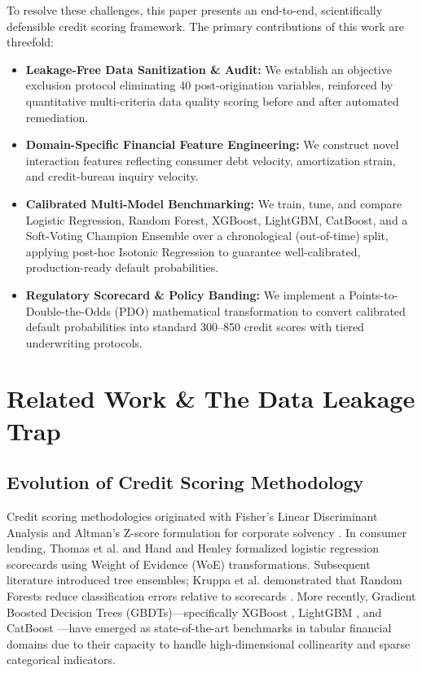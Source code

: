 \documentclass[conference]{IEEEtran}
\begin{document}
To resolve these challenges, this paper presents an end-to-end, scientifically defensible credit scoring framework. The primary contributions of this work are threefold:
\begin{itemize}
    \item \textbf{Leakage-Free Data Sanitization \& Audit:} We establish an objective exclusion protocol eliminating 40 post-origination variables, reinforced by quantitative multi-criteria data quality scoring before and after automated remediation.
    \item \textbf{Domain-Specific Financial Feature Engineering:} We construct novel interaction features reflecting consumer debt velocity, amortization strain, and credit-bureau inquiry velocity.
    \item \textbf{Calibrated Multi-Model Benchmarking:} We train, tune, and compare Logistic Regression, Random Forest, XGBoost, LightGBM, CatBoost, and a Soft-Voting Champion Ensemble over a chronological (out-of-time) split, applying post-hoc Isotonic Regression to guarantee well-calibrated, production-ready default probabilities.
    \item \textbf{Regulatory Scorecard \& Policy Banding:} We implement a Points-to-Double-the-Odds (PDO) mathematical transformation to convert calibrated default probabilities into standard 300--850 credit scores with tiered underwriting protocols.
\end{itemize}

\section{Related Work \& The Data Leakage Trap}

\subsection{Evolution of Credit Scoring Methodology}
Credit scoring methodologies originated with Fisher's Linear Discriminant Analysis and Altman's Z-score formulation for corporate solvency \cite{altman1968}. In consumer lending, Thomas et al. \cite{thomas2002} and Hand and Henley \cite{hand1997} formalized logistic regression scorecards using Weight of Evidence (WoE) transformations. Subsequent literature introduced tree ensembles; Kruppa et al. demonstrated that Random Forests reduce classification errors relative to scorecards \cite{kruppa2013}. More recently, Gradient Boosted Decision Trees (GBDTs)---specifically XGBoost \cite{chen2016}, LightGBM \cite{ke2017}, and CatBoost \cite{prokhorenkova2018}---have emerged as state-of-the-art benchmarks in tabular financial domains due to their capacity to handle high-dimensional collinearity and sparse categorical indicators.
\end{document}
